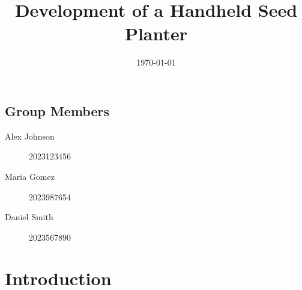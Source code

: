 \documentclass[a4paper,12pt]{report} %
\begin{document}
\title{ Development of a Handheld Seed Planter}

\date{\today}
\maketitle

\section*{Group Members}
\begin{description}
    \item[Alex Johnson] \hfill 2023123456
    \item[Maria Gomez] \hfill 2023987654
    \item[Daniel Smith] \hfill 2023567890
\end{description}


\chapter{Introduction}





\end{document}
